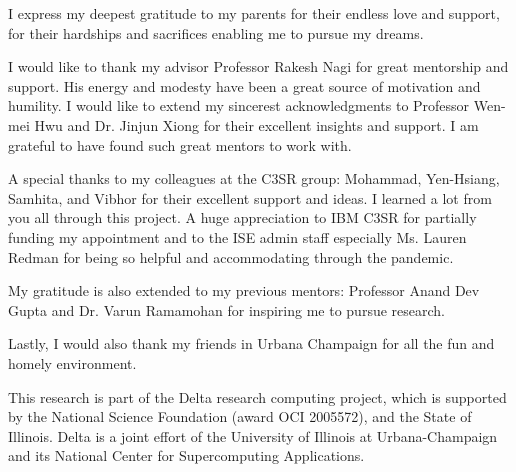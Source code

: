 I express my deepest gratitude to my parents for their endless love and support, for their hardships and sacrifices enabling me to pursue my dreams.

I would like to thank my advisor Professor Rakesh Nagi for great mentorship and support. His energy and modesty have been a great source of motivation and humility.
I would like to extend my sincerest acknowledgments to Professor Wen-mei Hwu and Dr. Jinjun Xiong for their excellent insights and support.
I am grateful to have found such great mentors to work with.

A special thanks to my colleagues at the C3SR group: Mohammad, Yen-Hsiang, Samhita, and Vibhor for their excellent support and ideas.
I learned a lot from you all through this project.
A huge appreciation to IBM C3SR for partially funding my appointment and to the ISE admin staff especially Ms. Lauren Redman for being so helpful and accommodating through the pandemic.

My gratitude is also extended to my previous mentors: Professor Anand Dev Gupta and Dr. Varun Ramamohan for inspiring me to pursue research.

Lastly, I would also thank my friends in Urbana Champaign for all the fun and homely environment.

This research is part of the Delta research computing project, which is supported by the National Science Foundation (award OCI 2005572), and the State of Illinois.
Delta is a joint effort of the University of Illinois at Urbana-Champaign and its National Center for Supercomputing Applications.